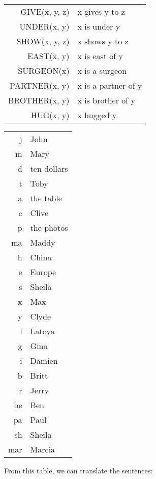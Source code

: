 \documentclass{article}
\begin{document}
\begin{center}
\begin{tabular}{r|l}
    GIVE(x, y, z) & x gives y to z \\
    UNDER(x, y) & x is under y  \\
    SHOW(x, y, z) & x shows y to z \\
    EAST(x, y) & x is east of y \\
    SURGEON(x) & x is a surgeon \\
    PARTNER(x, y) & x is a partner of y \\
    BROTHER(x, y) & x is brother of y \\
    HUG(x, y) & x hugged y \\
\end{tabular}
\begin{tabular}{r|l}
    j & John \\
    m & Mary \\
    d & ten dollars\\
    t & Toby \\
    a & the table \\
    c & Clive \\
    p & the photos \\
    ma & Maddy\\
    h & China \\
    e & Europe \\
    s & Sheila\\
    x & Max \\
    y & Clyde \\
    l & Latoya \\
    g & Gina \\
    i & Damien \\
    b & Britt\\
    r & Jerry \\
    be & Ben \\
    pa & Paul \\
    sh & Sheila \\
    mar & Marcia \\
\end{tabular}
\end{center}
From this table, we can translate the sentences:
\end{document}
